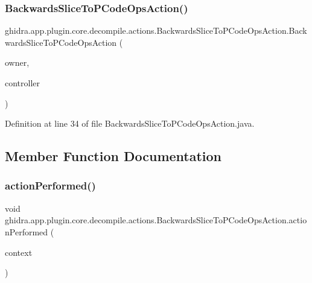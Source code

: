 \subsubsection{\texorpdfstring{BackwardsSliceToPCodeOpsAction()}{BackwardsSliceToPCodeOpsAction()}}
{\footnotesize\ttfamily ghidra.\+app.\+plugin.\+core.\+decompile.\+actions.\+Backwards\+Slice\+To\+P\+Code\+Ops\+Action.\+Backwards\+Slice\+To\+P\+Code\+Ops\+Action (\begin{DoxyParamCaption}\item[{String}]{owner,  }\item[{\mbox{\hyperlink{classghidra_1_1app_1_1decompiler_1_1component_1_1_decompiler_controller}{Decompiler\+Controller}}}]{controller }\end{DoxyParamCaption})\hspace{0.3cm}{\ttfamily [inline]}}



Definition at line 34 of file Backwards\+Slice\+To\+P\+Code\+Ops\+Action.\+java.



\subsection{Member Function Documentation}
\mbox{\label{classghidra_1_1app_1_1plugin_1_1core_1_1decompile_1_1actions_1_1_backwards_slice_to_p_code_ops_action_ad6dff03b45d55b7dbd9e1c60540bbec9}} 
\subsubsection{\texorpdfstring{actionPerformed()}{actionPerformed()}}
{\footnotesize\ttfamily void ghidra.\+app.\+plugin.\+core.\+decompile.\+actions.\+Backwards\+Slice\+To\+P\+Code\+Ops\+Action.\+action\+Performed (\begin{DoxyParamCaption}\item[{Action\+Context}]{context }\end{DoxyParamCaption})\hspace{0.3cm}{\ttfamily [inline]}}



